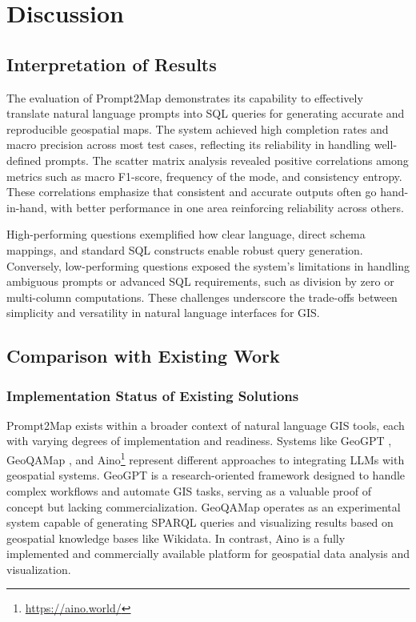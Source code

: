 
%

\chapter{Discussion}
\label{cha:discussion}

\section{Interpretation of Results}

The evaluation of Prompt2Map demonstrates its capability to effectively translate natural language prompts into SQL queries for generating accurate and reproducible geospatial maps. The system achieved high completion rates and macro precision across most test cases, reflecting its reliability in handling well-defined prompts. The scatter matrix analysis revealed positive correlations among metrics such as macro F1-score, frequency of the mode, and consistency entropy. These correlations emphasize that consistent and accurate outputs often go hand-in-hand, with better performance in one area reinforcing reliability across others.

High-performing questions exemplified how clear language, direct schema mappings, and standard SQL constructs enable robust query generation. Conversely, low-performing questions exposed the system's limitations in handling ambiguous prompts or advanced SQL requirements, such as division by zero or multi-column computations. These challenges underscore the trade-offs between simplicity and versatility in natural language interfaces for GIS.

\section{Comparison with Existing Work}

\subsection{Implementation Status of Existing Solutions}

Prompt2Map exists within a broader context of natural language GIS tools, each with varying degrees of implementation and readiness. Systems like GeoGPT \cite{kim_flex_2024}, GeoQAMap \cite{feng_geoqamap_2023}, and Aino\footnote{\url{https://aino.world/}} represent different approaches to integrating LLMs with geospatial systems. GeoGPT is a research-oriented framework designed to handle complex workflows and automate GIS tasks, serving as a valuable proof of concept but lacking commercialization. GeoQAMap  operates as an experimental system capable of generating SPARQL queries and visualizing results based on geospatial knowledge bases like Wikidata. In contrast, Aino is a fully implemented and commercially available platform for geospatial data analysis and visualization.

